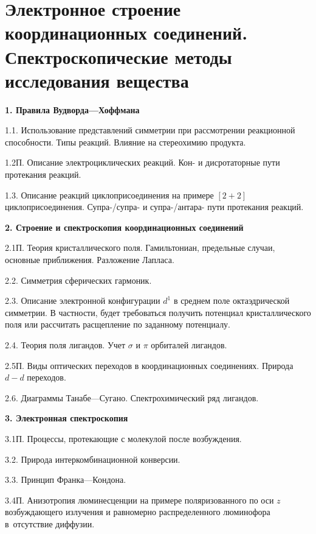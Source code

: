\section[Электронное строение координационных соединений.\\Спектроскопические методы исследования вещества]{\texorpdfstring{Электронное строение координационных соединений.\\Спектроскопические методы исследования вещества}{Электронное строение координационных соединений. Спектроскопические методы исследования вещества}}
\textbf{1. Правила Вудворда—Хоффмана}\par
1.1. Использование представлений симметрии при рассмотрении реакционной способности. Типы реакций. Влияние на стереохимию продукта.\par
1.2П. Описание электроциклических реакций. Кон- и дисротаторные пути протекания реакций.\par
1.3. Описание реакций циклоприсоединения на примере $[2+2]$ циклоприсоединения. Супра-/супра- и супра-/антара- пути протекания реакций.\par
\textbf{2. Строение и спектроскопия координационных соединений}\par
2.1П. Теория кристаллического поля. Гамильтониан, предельные случаи, основные приближения. Разложение Лапласа.\par
2.2. Симметрия сферических гармоник.\par
2.3. Описание электронной конфигурации $d^1$ в среднем поле октаэдрической симметрии. В частности, будет требоваться получить потенциал кристаллического поля или рассчитать расщепление по заданному потенциалу.\par
2.4. Теория поля лигандов. Учет $\sigma$ и $\pi$ орбиталей лигандов.\par
2.5П. Виды оптических переходов в координационных соединениях. Природа $d-d$ переходов.\par
2.6. Диаграммы Танабе—Сугано. Спектрохимический ряд лигандов.\par
\textbf{3. Электронная спектроскопия}\par
3.1П. Процессы, протекающие с молекулой после возбуждения.\par
3.2. Природа интеркомбинационной конверсии.\par
3.3. Принцип Франка—Кондона.\par
3.4П. Анизотропия люминесценции на примере поляризованного по оси $z$ возбуждающего излучения и равномерно распределенного люминофора в~отсутствие диффузии.\par
